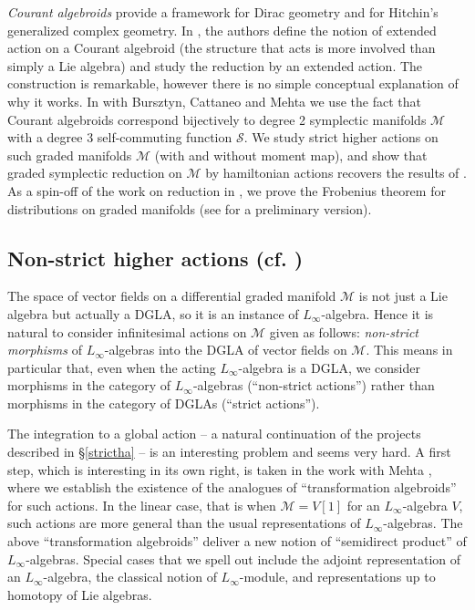 \documentclass[11pt]{amsart}
\newcommand{\cS}{\mathcal{S}}
\newcommand{\cM}{\mathcal{M}}
\begin{document}
\emph{Courant algebroids} provide a framework for Dirac geometry and for Hitchin's generalized complex 
geometry. In   \cite{BCG}, the authors define the  notion of extended action on a Courant 
algebroid (the  structure that acts is more involved than simply a Lie algebra) and study the reduction by 
an extended action. 
The construction is remarkable, however there is no simple conceptual explanation of why it works. 
In \cite{BCMZ}  with Bursztyn,  Cattaneo and  Mehta  we use the fact that 
Courant algebroids correspond bijectively to degree 2 symplectic manifolds $\cM$ with a degree 3 self-commuting function $\cS$. We study strict  higher  actions on such graded manifolds $\cM$ (with and without moment map), and show that graded symplectic reduction on $\cM$ by hamiltonian actions recovers the results of \cite{BCG}. As a spin-off of the work on reduction in \cite{BCMZ}, we prove the Frobenius theorem for distributions on graded manifolds (see \cite{BCMZ2}  for a preliminary version). 


\subsection{Non-strict higher actions (cf. \cite{RajMarco}\cite{ZZL2})} 
The space of vector fields on a differential graded manifold $\cM$ is not just a Lie algebra but actually a 
DGLA, so it is  an instance  of $L_{\infty}$-algebra. 
Hence it is natural to consider  infinitesimal actions on $\cM$ given as follows: \emph{non-strict morphisms} of $L_{\infty}$-algebras into the DGLA of vector fields on $\cM$. This means in particular that, even when the acting 
$L_{\infty}$-algebra is a DGLA, we consider    morphisms in the category of $L_{\infty}$-algebras (``non-strict 
actions'') rather than  morphisms in the category of DGLAs (``strict actions''). 

The integration to a global action -- a natural continuation of the projects  described in \S \ref{strictha} -- is an 
interesting problem and seems very hard. A first step, which is interesting in its own right, is taken in the work with   Mehta \cite{RajMarco}, where we establish the existence of the analogues of ``transformation 
algebroids'' for such actions. In the linear case, that is when $\cM=V[1]$ for an $L_{\infty}$-algebra $V$,   such 
actions are more general than the usual representations of $L_{\infty}$-algebras. The above 
``transformation algebroids'' deliver a new notion of ``semidirect product'' of $L_{\infty}$-algebras. Special cases that  we spell out include  the adjoint representation of an $L_{\infty}$-algebra, the classical notion of $L_{\infty}$-module, and representations up to homotopy of Lie algebras.
\end{document}
